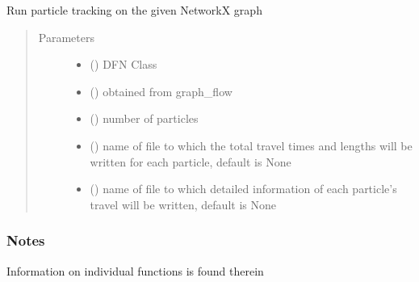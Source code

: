 \documentclass[letterpaper,10pt,english]{sphinxmanual}
\begin{document}

\begin{fulllineitems}
\label{\detokenize{pydfnworks:pydfnworks.dfnGraph.graph_transport.run_graph_transport}}
Run  particle tracking on the given NetworkX graph
\begin{quote}\begin{description}
\item[{Parameters}] \leavevmode\begin{itemize}
\item {} 
 () \textendash{} DFN Class

\item {} 
 () \textendash{} obtained from graph\_flow

\item {} 
 () \textendash{} number of particles

\item {} 
 () \textendash{} name of file to  which the total travel times and lengths will be written for each particle, default is None

\item {} 
 () \textendash{} name of file to which detailed information of each particle’s travel will be written, default is None

\end{itemize}

\end{description}\end{quote}
\subsubsection*{Notes}

Information on individual functions is found therein

\end{fulllineitems}
\end{document}
